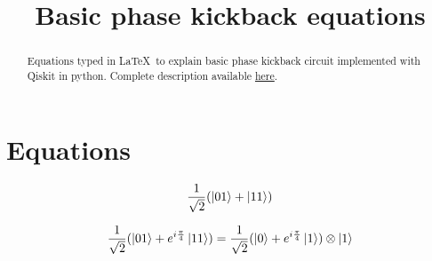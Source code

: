 \documentclass[]{article}
\title{Basic phase kickback equations}
\author{}
\date{}
\begin{document}
\maketitle

\begin{abstract}
	Equations typed in \LaTeX\ to explain basic phase kickback circuit implemented with Qiskit in python. Complete description available \href{https://github.com/epelaaez/QuantumLibrary/tree/master/algorithms/basic_phase_kickback}{here}.
\end{abstract}

\section*{Equations}

\begin{equation*}
\frac{1}{\sqrt{2}}(\ket{01} + \ket{11})
\end{equation*}

\begin{equation*}
\frac{1}{\sqrt{2}}(\ket{01} + e^{i\frac{\pi}{4}}\ket{11}) = \frac{1}{\sqrt{2}}(\ket{0} + e^{i\frac{\pi}{4}}\ket{1}) \otimes \ket{1}
\end{equation*}
\end{document}

